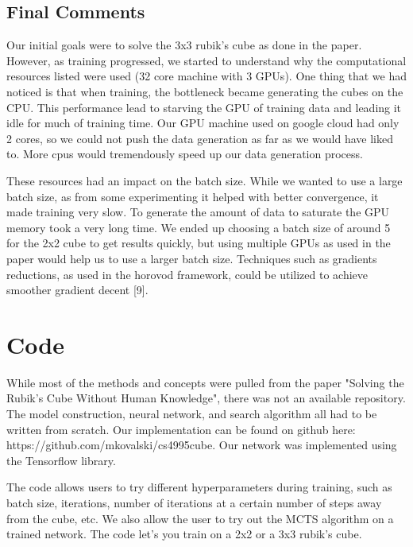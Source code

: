 \documentclass[10pt,twocolumn,letterpaper]{article}
\begin{document}
\subsection{Final Comments}

Our initial goals were to solve the 3x3 rubik's cube as done in the paper. However, as training progressed, we started to understand why the computational resources listed were used (32 core machine with 3 GPUs). One thing that we had noticed is that when training, the bottleneck became generating the cubes on the CPU. This performance lead to starving the GPU of training data and leading it idle for much of training time. Our GPU machine used on google cloud had only 2 cores, so we could not push the data generation as far as we would have liked to. More cpus would tremendously speed up our data generation process.

These resources had an impact on the batch size. While we wanted to use a large batch size, as from some experimenting it helped with better convergence, it made training very slow. To generate the amount of data to saturate the GPU memory took a very long time. We ended up choosing a batch size of around 5 for the 2x2 cube to get results quickly, but using multiple GPUs as used in the paper would help us to use a larger batch size. Techniques such as gradients reductions, as used in the horovod framework, could be utilized to achieve smoother gradient decent [9].




\section{Code}

While most of the methods and concepts were pulled from the paper "Solving the Rubik’s Cube Without Human Knowledge", there was not an available repository.  The model construction, neural network, and search algorithm all had to be written from scratch.  Our implementation can be found on github here: https://github.com/mkovalski/cs4995\textunderscore cube.  Our network was implemented using the Tensorflow library. 

The code allows users to try different hyperparameters during training, such as batch size, iterations, number of iterations at a certain number of steps away from the cube, etc.   We also allow the user to try out the MCTS algorithm on a trained network. The code let's you train on a 2x2 or a 3x3 rubik's cube. 
\end{document}
